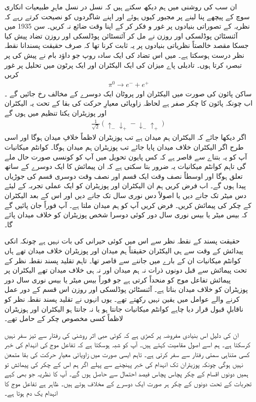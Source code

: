 ان سب کی روشنی میں ہم دیکھ سکتے ہیں کہ نسل در نسل ماہرِ طبیعیات انکاری سوچ کے پیچھے پنا لینے پر مجبور کیوں ہوئے اور اپنے شاگردوں کو نصیحت کرتے رہے کہ نظریہ کے تصوراتی بنیادوں پر غور و فکر کر کے اپنا وقت ضائع نہ کریں۔
سن \num{1935} میں آئنسٹائن پوڈلسکی اور روزن نے مل کر آئنسٹائن پوڈلسکی اور روزن تضاد پیش کیا جسکا مقصد خالصتاً نظریاتی بنیادوں پر یہ ثابت کرنا تھا کہ صرف حقیقت پسندانا نقطہ نظر درست ہوسکتا ہے۔ میں اس تضاد کی ایک سادہ روپ جو داؤد بام نے پیش کی پر تبصرہ کرتا ہوں۔ تادیلی پاے میزان کی ایک الیکٹران اور ایک پرٹون میں تحلیل پر غور کریں
\begin{align*}
	\pi^0\to e^{-}+e^{+}
\end{align*}
ساکن پائون کی صورت میں الیکٹران اور پروٹان ایک دوسرے کے مخالف رخ جائیں گے ۔ اب چونکہ پائون کا چکر صفر ہے لحاظہ زاویائی معیارِ حرکت کی بقا کے تحت یہ الیکٹران اور پوزیٹران یکتا تنظیم میں ہوں گے
\begin{align}
	\frac{1}{\sqrt{2}}(\uparrow_{-}\downarrow_{+}-\downarrow_{-}\uparrow_{+})
\end{align}
اگر دیکھا جائے کہ الیکٹران ہم میدان ہے تب پوزیٹران لاظماً خلافِ میدان ہوگا اور اسی طرح اگر الیکٹران خلاف میدان پایا جائے تب پوزیٹران ہم میدان ہوگا۔ کوانٹم میکانیات آپ کو یہ بتناے سے قاصر ہے کہ کس پایون تحویل میں آپ کو کونسی صورت حال ملے گی تاہم کوانٹم میکانیات یہ ضرور بتا سکتی ہے کہ ان پیمائش کا ایک دوسرے کے ساتھ تعلق ہوگا اور اوسطاً نصف وقت ایک قسم اور نصف وقت دوسری قسم کی جوڑیاں پیدا ہوں گے۔ اب فرض کریں ہم ان الیکٹران اور پوزیٹران کو ایک عملی تجربہ کے لیئے دس میٹر تک جانے دیں یا اصولاً دس نوری سال تک جانے دیں اور اس کے بعد الیکٹران کے چکر کی پیمائش کریں۔ فرض کریں آپ کو ہم میدان ملتا ہے۔ آپ فوراً جان پائیں گے کہ بیس میٹر یا بیس نوری سال دور کوئی دوسرا شخص پوزیٹران کو خلاف میدان پائے گا۔

حقیقت پسند کے نقطہ نظر سے اس میں کوئی حیرانی کی بات نہیں ہے چونکہ انکی پیدائش کے وقت سے ہی الیکٹران حقیقتاً ہم میدان اور پوزیٹران خلاف میدان تھے ہاں کوانٹم میکانیات ان کے بارے میں جاننے سے قاصر تھا۔ تاہم تقلید پسند نقطہ نظر کے تحت پیمائش سے قبل دونوں ذرات نہ ہم میدان اور نہ ہی خلاف میدان تھے الیکٹران پر پیمائش تفاعل موج کو منحداً کرتی ہے جو فوراً بیس میٹر یا بیس نوری سال دور پوزیٹران کو خلاف میدان بناتا ہے۔ آئنسٹائن پوڈلسکی اور روزن اس قسم کے دور عمل کرنے والے عوامل میں یقین نہیں رکھتے تھے۔ یوں انہوں نے تقلید پسند نقطہ نظر کو ناقابلِ قبول قرار دیا چاہے کوانٹم میکانیات جانتا ہو یا نہ جانتا ہو الیکٹران اور ہوزیٹران لاظماً کسی مخصوص چکر کے حامل تھے۔

ان کی دلیل اس بنیادی مفروضہ پر کھڑی ہے کہ کوئی ھبی اثر روشنی کی رفتار سے تیز سفر نہیں کرسکتا ہے۔ ہم اسے اصول مقامیت کہتے ہیں۔ آپ کو شبہ ہوسکتا ہے کہ تفاعل موج کی انہدام کی خبر کسی متناہی سمتی رفتار سے سفر کرتی ہے۔ تاہم ایسی صورت میں زاویائی معیارِ حرکت کی بقا متمعن نہیں ہوگی چونکہ پوزیٹران تک انہدام کی خبر پہنچنے سے پہلے اگر ہم اس کے چکر کی پیمائش تو ہمیں دونوں اقسام کے چکر پچاس پچاس فیصد احتمال سے حاصل ہوں گے۔ آپ کا نظریہ جو بھی کہے تجربات کے تحت دونوں کے چکر ہر صورت ایک دوسرے کے مخلاف ہوتے ہیں۔ ظاہر ہے تفاعل موج کا انہدام یک دم ہوتا ہے۔

